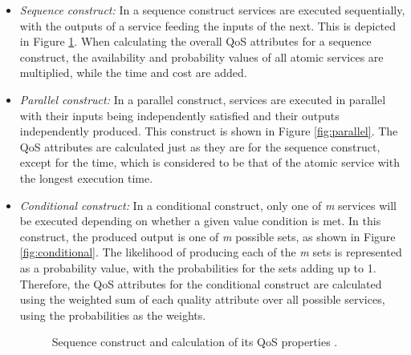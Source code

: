 \documentclass[conference]{IEEEtran}
\begin{document}
\begin{itemize}
\item \textit{Sequence construct:} In a sequence construct services are executed sequentially, with the outputs of a service feeding the inputs of the next. 
This is depicted in Figure \ref{fig:sequence}. When calculating the overall QoS attributes for a sequence construct, the availability and probability values of all atomic
services are multiplied, while the time and cost are added.

\item \textit{Parallel construct:} In a parallel construct, services are executed in parallel with their inputs being independently satisfied and their outputs 
independently produced. This construct is shown in Figure \ref{fig:parallel}. The QoS attributes are calculated just as they are for the sequence construct, except for the 
time, which is considered to be that of the atomic service with the longest execution time.

\item \textit{Conditional construct:} In a conditional construct, only one of \textit{m} services will be executed depending on whether a given value condition is met. 
In this construct, the produced output is one of \textit{m} possible sets, as shown in Figure \ref{fig:conditional}. The likelihood of producing each of the \textit{m} sets is represented as
a probability value, with the probabilities for the sets adding up to 1. Therefore, the QoS attributes for the conditional construct are calculated using the
weighted sum of each quality attribute over all possible services, using the probabilities as the weights.

\begin{figure}
\centerline{
}
\caption{Sequence construct and calculation of its QoS properties
\cite{silva2014graph}.}
\label{fig:sequence}
\vspace{0.3cm}


\end{figure}
\end{itemize}
\end{document}
